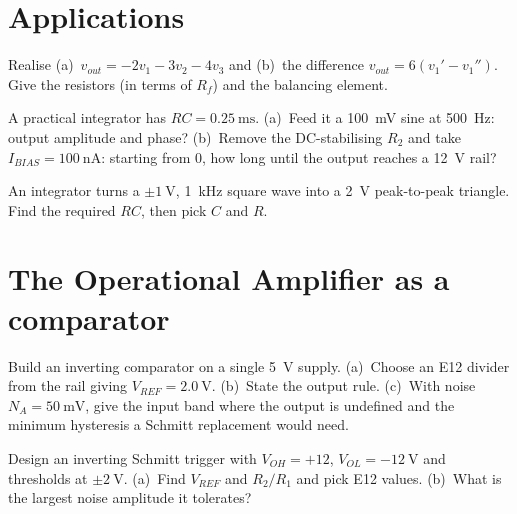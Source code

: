 \documentclass[11pt,a4paper,oneside]{book}
\begin{document}
\chapter{Applications}

\begin{exercise}
Realise (a)~$v_{out}=-2v_1-3v_2-4v_3$ and (b)~the difference
$v_{out}=6(v_1'-v_1'')$. Give the resistors (in terms of $R_f$) and the balancing
element.
\end{exercise}

\begin{exercise}
A practical integrator has $RC=\qty{0.25}{\milli\second}$.
(a)~Feed it a \qty{100}{\milli\volt} sine at \qty{500}{\hertz}: output amplitude
and phase?
(b)~Remove the DC-stabilising $R_2$ and take $I_{BIAS}=\qty{100}{\nano\ampere}$:
starting from $0$, how long until the output reaches a \qty{12}{\volt} rail?
\end{exercise}

\begin{exercise}
An integrator turns a $\pm\qty{1}{\volt}$, \qty{1}{\kilo\hertz} square wave into a
\qty{2}{\volt} peak-to-peak triangle. Find the required $RC$, then pick $C$ and
$R$.
\end{exercise}

\chapter{The Operational Amplifier as a comparator}

\begin{exercise}
Build an inverting comparator on a single \qty{5}{\volt} supply.
(a)~Choose an E12 divider from the rail giving $V_{REF}=\qty{2.0}{\volt}$.
(b)~State the output rule.
(c)~With noise $N_A=\qty{50}{\milli\volt}$, give the input band where the output
is undefined and the minimum hysteresis a Schmitt replacement would need.
\end{exercise}

\begin{exercise}
Design an inverting Schmitt trigger with $V_{OH}=+12$, $V_{OL}=\qty{-12}{\volt}$
and thresholds at $\pm\qty{2}{\volt}$.
(a)~Find $V_{REF}$ and $R_2/R_1$ and pick E12 values.
(b)~What is the largest noise amplitude it tolerates?
\end{exercise}
\end{document}
